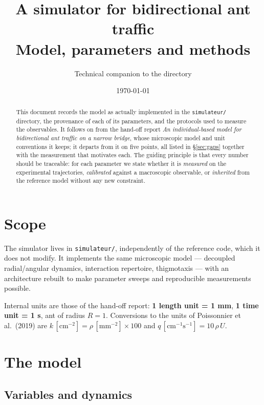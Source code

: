\documentclass[11pt,a4paper]{article}
\title{\textbf{A simulator for bidirectional ant traffic}\\[4pt]
       \large Model, parameters and methods}
\author{Technical companion to the \code{simulateur/} directory}
\date{\today}
\newcommand{\code}[1]{\texttt{#1}}
\begin{document}
\maketitle

\begin{abstract}
\noindent This document records the model as actually implemented in the
\code{simulateur/} directory, the provenance of each of its parameters, and the
protocols used to measure the observables. It follows on from the hand-off
report \emph{An individual-based model for bidirectional ant traffic on a
narrow bridge}, whose microscopic model and unit conventions it keeps; it
departs from it on five points, all listed in \S\ref{sec:gaps} together with
the measurement that motivates each. The guiding principle is that every number
should be traceable: for each parameter we state whether it is \emph{measured}
on the experimental trajectories, \emph{calibrated} against a macroscopic
observable, or \emph{inherited} from the reference model without any new
constraint.
\end{abstract}

\tableofcontents
\bigskip

\section{Scope}

The simulator lives in \code{simulateur/}, independently of the reference code,
which it does not modify. It implements the same microscopic model --- decoupled
radial/angular dynamics, interaction repertoire, thigmotaxis --- with an
architecture rebuilt to make parameter sweeps and reproducible measurements
possible.

Internal units are those of the hand-off report: \textbf{1 length unit = 1 mm},
\textbf{1 time unit = 1 s}, ant of radius $R = 1$. Conversions to the units of
Poissonnier et al.\ (2019) are
$k\,[\mathrm{cm^{-2}}] = \rho\,[\mathrm{mm^{-2}}]\times 100$ and
$q\,[\mathrm{cm^{-1}s^{-1}}] = 10\,\rho\,U$.

\section{The model}

\subsection{Variables and dynamics}
\end{document}
